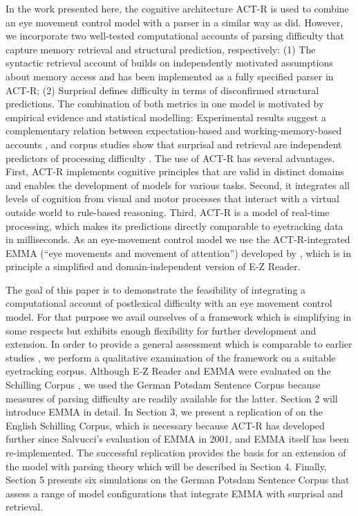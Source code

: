 In the work presented here, the cognitive architecture ACT-R \cite{AndersonEtAl2004} is used to combine an eye movement control model with a parser in a similar way as \cite{ReichleWarrenMcConnell2009} did. However, we incorporate two well-tested computational accounts of parsing difficulty that capture  memory retrieval and  structural prediction, respectively: (1) The syntactic retrieval account of \cite{LewisVasishth2005} builds on independently motivated assumptions about memory access and has been implemented as a fully specified parser in ACT-R; (2) Surprisal \cite{Hale2001,Levy2008} defines difficulty in terms of disconfirmed structural predictions.
The combination of both metrics in one model is motivated by empirical evidence and statistical modelling: Experimental results suggest a complementary relation between expectation-based and working-memory-based accounts \citep{Demberg2008,Konieczny2000,Vasishth2011,Staub2010a}, and corpus studies show that surprisal and retrieval are independent predictors of processing difficulty \citep{Boston2008,BostonHaleVasishth2011,Patil2009,VasishthLewis2006}. 
The use of ACT-R has several advantages. First, ACT-R implements cognitive principles that are valid in distinct domains and enables the development of models for various tasks. Second, it integrates all levels of cognition from visual and motor processes that interact with a virtual outside world to rule-based reasoning.  Third, ACT-R is a model of real-time processing, which makes its predictions directly comparable to eyetracking data in milliseconds.
As an eye-movement control model we use the ACT-R-integrated EMMA   (``eye movements and movement of attention'') developed by \cite{Salvucci2001}, which is in principle a simplified and domain-independent version of E-Z Reader.

The goal of this paper is to demonstrate the feasibility of integrating a computational account of postlexical difficulty with an eye movement control model.  For that purpose we avail ourselves of a framework which is simplifying in some respects but exhibits enough flexibility for further development and extension.  In order to provide a general assessment which is comparable to earlier studies \citep{Reichle1998,ReichleWarrenMcConnell2009,Salvucci2001}, we perform a qualitative examination of the framework on a suitable eyetracking corpus.  Although E-Z Reader and EMMA were evaluated on the Schilling Corpus \cite{Schilling1998}, we used the German Potsdam Sentence Corpus \cite{Kliegl2004} because measures of parsing difficulty are readily available for the latter.
Section 2 will introduce EMMA in detail.  In Section 3, we present a replication of \cite{Salvucci2001} on the English Schilling Corpus, which is necessary because ACT-R has developed further since Salvucci's evaluation of EMMA in 2001, and EMMA itself has been re-implemented.  The successful replication provides the basis for an extension of the model with parsing theory which will be described in Section 4.  Finally, Section 5 presents six simulations on the German Potsdam Sentence Corpus that assess a range of model configurations that integrate EMMA with surprisal and retrieval.

